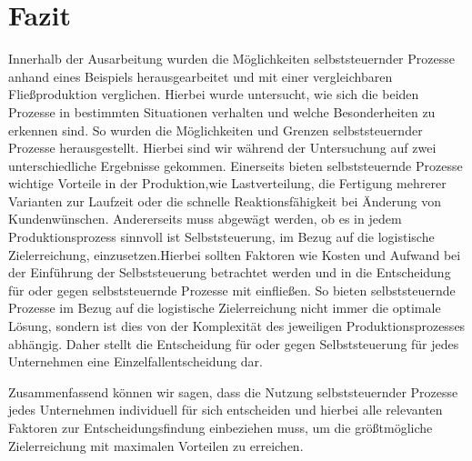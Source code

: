 \section{Fazit}
\label{sec:Fazit}
Innerhalb der Ausarbeitung wurden die Möglichkeiten selbststeuernder Prozesse
anhand eines Beispiels herausgearbeitet und mit einer vergleichbaren
Fließproduktion verglichen. Hierbei wurde untersucht, wie sich die beiden
Prozesse in bestimmten Situationen verhalten und welche Besonderheiten zu
erkennen sind. So wurden die Möglichkeiten und Grenzen selbststeuernder
Prozesse herausgestellt. Hierbei sind wir während der Untersuchung auf zwei
unterschiedliche Ergebnisse gekommen. Einerseits bieten selbststeuernde
Prozesse wichtige Vorteile in der Produktion,wie Lastverteilung, die Fertigung
mehrerer Varianten zur Laufzeit oder die schnelle Reaktionsfähigkeit bei
Änderung von Kundenwünschen. Andererseits muss abgewägt werden, ob es in jedem
Produktionsprozess sinnvoll ist Selbststeuerung, im Bezug auf die logistische
Zielerreichung, einzusetzen.Hierbei sollten Faktoren wie Kosten und Aufwand bei
der Einführung der Selbststeuerung betrachtet werden und in die Entscheidung
für oder gegen selbststeuernde Prozesse mit einfließen. So bieten
selbststeuernde Prozesse im Bezug auf die logistische Zielerreichung nicht
immer die optimale Lösung, sondern ist dies von der Komplexität des jeweiligen
Produktionsprozesses abhängig. Daher stellt die Entscheidung für oder gegen
Selbststeuerung für jedes Unternehmen eine Einzelfallentscheidung dar.

Zusammenfassend können wir sagen, dass die Nutzung selbststeuernder Prozesse
jedes Unternehmen individuell für sich entscheiden und hierbei alle relevanten
Faktoren zur Entscheidungsfindung einbeziehen muss, um die größtmögliche
Zielerreichung mit maximalen Vorteilen zu erreichen.




